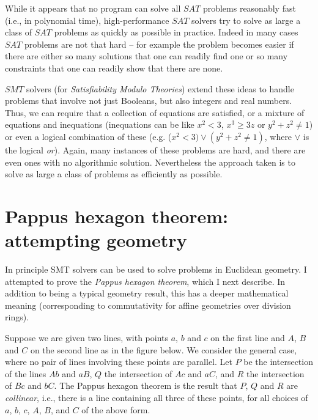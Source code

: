 \documentclass{amsart}
\theoremstyle{plain}
\theoremstyle{definition}
\theoremstyle{remark}
\begin{document}
While it appears that no program can solve all \(SAT\) problems
reasonably fast (i.e., in polynomial time), high-performance \(SAT\)
solvers try to solve as large a class of \(SAT\) problems as quickly as
possible in practice. Indeed in many cases \(SAT\) problems are not that
hard -- for example the problem becomes easier if there are either so
many solutions that one can readily find one or so many constraints that
one can readily show that there are none.

\(SMT\) solvers (for \emph{Satisfiability Modulo Theories}) extend these
ideas to handle problems that involve not just Booleans, but also
integers and real numbers. Thus, we can require that a collection of
equations are satisfied, or a mixture of equations and inequations
(inequations can be like \(x^2 < 3\), \(x^3 \geq 3z\) or
\(y^2 + z^2 \neq 1\)) or even a logical combination of these (e.g.
(\(x^2 < 3)\vee(y^2 + z^2 \neq 1)\), where \(\vee\) is the logical
\emph{or}). Again, many instances of these problems are hard, and there
are even ones with no algorithmic solution. Nevertheless the approach
taken is to solve as large a class of problems as efficiently as
possible.


\section{Pappus hexagon theorem: attempting
  geometry}\label{pappus-hexagon-theorem-attempting-geometry}

In principle SMT solvers can be used to solve problems in Euclidean
geometry. I attempted to prove the \emph{Pappus hexagon theorem}, which
I next describe. In addition to being a typical geometry result, this
has a deeper mathematical meaning (corresponding to commutativity for
affine geometries over division rings).

Suppose we are given two lines, with points \(a\), \(b\) and \(c\) on
the first line and \(A\), \(B\) and \(C\) on the second line as in the
figure below. We consider the general case, where no pair of lines
involving these points are parallel. Let \(P\) be the intersection of
the lines \(Ab\) and \(aB\), \(Q\) the intersection of \(Ac\) and
\(aC\), and \(R\) the intersection of \(Bc\) and \(bC\). The Pappus
hexagon theorem is the result that \(P\), \(Q\) and \(R\) are
\emph{collinear}, i.e., there is a line containing all three of these
points, for all choices of \(a\), \(b\), \(c\), \(A\), \(B\), and \(C\)
of the above form.
\end{document}
